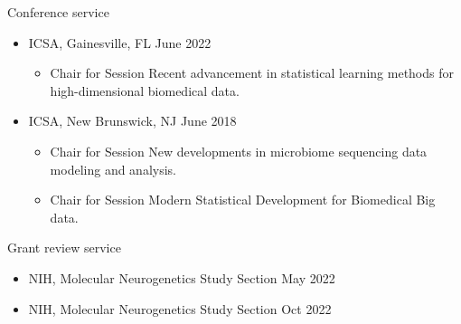 \documentclass{resume} %
\begin{document}



\begin{rSection}{Conference service}

\begin{itemize}[noitemsep,topsep=0pt]
\item  ICSA, Gainesville, FL  \hfill {June 2022}
\begin{itemize}[noitemsep,topsep=0pt]
\item{Chair for Session Recent advancement in statistical learning methods for high-dimensional biomedical data.}
\end{itemize}


\item  ICSA, New Brunswick, NJ  \hfill {June 2018}
\begin{itemize}[noitemsep,topsep=0pt]
\item{Chair for Session New developments in microbiome sequencing data modeling and analysis.}
\item{Chair for Session Modern Statistical Development for Biomedical Big data.}
\end{itemize}


\end{itemize}

\end{rSection}


\begin{rSection}{Grant review service}

\begin{itemize}[noitemsep,topsep=0pt]
\item  NIH, Molecular Neurogenetics Study Section   \hfill {May 2022}
\item  NIH, Molecular Neurogenetics Study Section   \hfill {Oct 2022}
\end{itemize}

\end{rSection}
\end{document}
